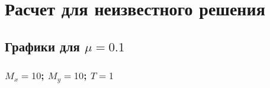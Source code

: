 \section{Расчет для неизвестного решения}
\subsection{Графики для $\mu=0.1$} 
\subsubsection{$M_x=10$; $M_y=10$; $T=1$}
\begin{figure}[H]
\begin{minipage}[h]{0.43\linewidth}
\end{minipage}
\hfill
\begin{minipage}[h]{0.43\linewidth}
\end{minipage}
\end{figure}

